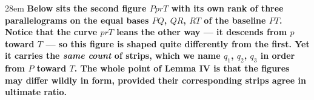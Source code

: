 \documentclass[border=4pt]{standalone}
\begin{document}
\begin{varwidth}{28em}
\large\bfseries
Below sits the \textcolor{figbteal}{second figure $PprT$ with its own rank of three parallelograms} on the equal bases $PQ$, $QR$, $RT$ of \textcolor{basegreen}{the baseline $PT$}. Notice that \textcolor{curvered}{the curve $prT$} leans the other way --- it descends from $p$ toward $T$ --- so this figure is shaped quite differently from the first. Yet it carries the \emph{same count} of strips, which we name $q_1$, $q_2$, $q_3$ in order from $P$ toward $T$. The whole point of Lemma IV is that the figures may differ wildly in form, provided their corresponding strips agree in ultimate ratio.
\end{varwidth}
\end{document}
